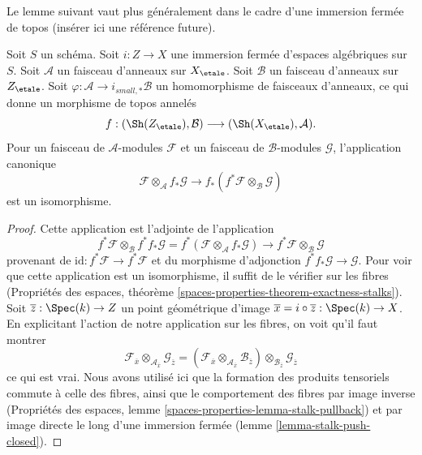 \noindent
Le lemme suivant vaut plus généralement dans le cadre d'une immersion fermée
de topos (insérer ici une référence future).

\begin{lemma}
\label{lemma-closed-immersion-rings}
Soit $S$ un schéma. Soit $i : Z \to X$ une immersion fermée d'espaces
algébriques sur $S$. Soit $\mathcal{A}$ un faisceau d'anneaux sur $X_\etale$.
Soit $\mathcal{B}$ un faisceau d'anneaux sur $Z_\etale$.
Soit $\varphi : \mathcal{A} \to i_{small, *}\mathcal{B}$
un homomorphisme de faisceaux d'anneaux, ce qui donne un
morphisme de topos annelés
$$
f : (\Sh(Z_\etale), \mathcal{B}) \longrightarrow (\Sh(X_\etale), \mathcal{A}).
$$
Pour un faisceau de $\mathcal{A}$-modules $\mathcal{F}$ et un
faisceau de $\mathcal{B}$-modules $\mathcal{G}$, l'application canonique
$$
\mathcal{F} \otimes_\mathcal{A} f_*\mathcal{G}
\longrightarrow
f_*(f^*\mathcal{F} \otimes_\mathcal{B} \mathcal{G})
$$
est un isomorphisme.
\end{lemma}

\begin{proof}
Cette application est l'adjointe de l'application
$$
f^*\mathcal{F} \otimes_\mathcal{B}
f^* f_*\mathcal{G} =
f^*(\mathcal{F} \otimes_\mathcal{A} f_*\mathcal{G})
\longrightarrow
f^*\mathcal{F} \otimes_\mathcal{B} \mathcal{G}
$$
provenant de $\text{id} : f^*\mathcal{F} \to f^*\mathcal{F}$
et du morphisme d'adjonction $f^* f_*\mathcal{G} \to \mathcal{G}$.
Pour voir que cette application est un isomorphisme, il suffit de le vérifier sur les fibres
(Propriétés des espaces, théorème
\ref{spaces-properties-theorem-exactness-stalks}).
Soit $\overline{z} : \Spec(k) \to Z$ un point géométrique
d'image $\overline{x} = i \circ \overline{z} : \Spec(k) \to X$.
En explicitant l'action de notre application sur les fibres, on voit qu'il
faut montrer
$$
\mathcal{F}_{\overline{x}}
\otimes_{\mathcal{A}_{\overline{x}}}
\mathcal{G}_{\overline{z}} =
(\mathcal{F}_{\overline{x}}
\otimes_{\mathcal{A}_{\overline{x}}}
\mathcal{B}_{\overline{z}}) \otimes_{\mathcal{B}_{\overline{z}}}
\mathcal{G}_{\overline{z}}
$$
ce qui est vrai. Nous avons utilisé ici que
la formation des produits tensoriels commute à celle des fibres, ainsi que le
comportement des fibres par image inverse (Propriétés des espaces,
lemme \ref{spaces-properties-lemma-stalk-pullback}) et par image directe
le long d'une immersion fermée (lemme
\ref{lemma-stalk-push-closed}).
\end{proof}






